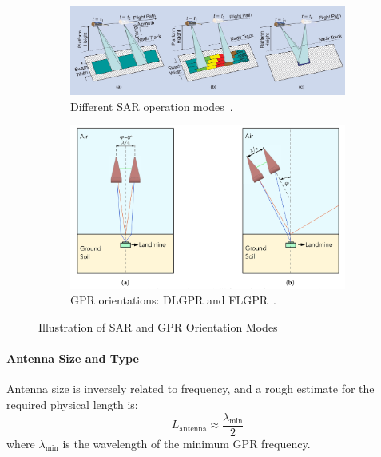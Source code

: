 \begin{figure}[h!]
    \centering
    \begin{subfigure}[b]{0.48\linewidth}
        \centering
        \includegraphics[width=\linewidth]{figs/Huirui/sar_modes.png}
        \caption{Different SAR operation modes~\cite{moreira2013tutorial}.}
        \label{fig:sar_modes}
    \end{subfigure}
    \hfill
    \begin{subfigure}[b]{0.48\linewidth}
        \centering
        \includegraphics[width=\linewidth]{figs/Huirui/gpr_ori_modes.png}
        \caption{GPR orientations: DLGPR and FLGPR~\cite{vsipovs2020lightweight}.}
        \label{fig:GPR_Ori_modes}
    \end{subfigure}
    \caption{Illustration of SAR and GPR Orientation Modes}
    \label{fig:sar_gpr_modes}
\end{figure}


\paragraph{Antenna Size and Type}

Antenna size is inversely related to frequency, and a rough estimate for the required physical length is:
\[
L_{\text{antenna}} \approx \frac{\lambda_{\text{min}}}{2}
\]
where  $\lambda_{\text{min}}$ is the wavelength of the minimum GPR frequency.

